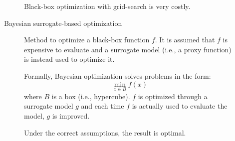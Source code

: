 \begin{description}
\begin{description}
                \begin{remark}
                    Black-box optimization with grid-search is very costly.
                \end{remark}

            \item[Bayesian surrogate-based optimization] 
                Method to optimize a black-box function $f$. It is assumed that $f$ is expensive to evaluate and a surrogate model (i.e., a proxy function) is instead used to optimize it.

                Formally, Bayesian optimization solves problems in the form:
                \[ \min_{x \in B} f(x) \]
                where $B$ is a box (i.e., hypercube). $f$ is optimized through a surrogate model $g$ and each time $f$ is actually used to evaluate the model, $g$ is improved.

                \begin{remark}
                    Under the correct assumptions, the result is optimal.
                \end{remark}
        \end{description}
\end{description}